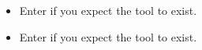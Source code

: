

\begin{itemize}
\item Enter  if you expect the tool to exist. 
\item Enter  if you expect the tool  to exist. 
\end{itemize}
